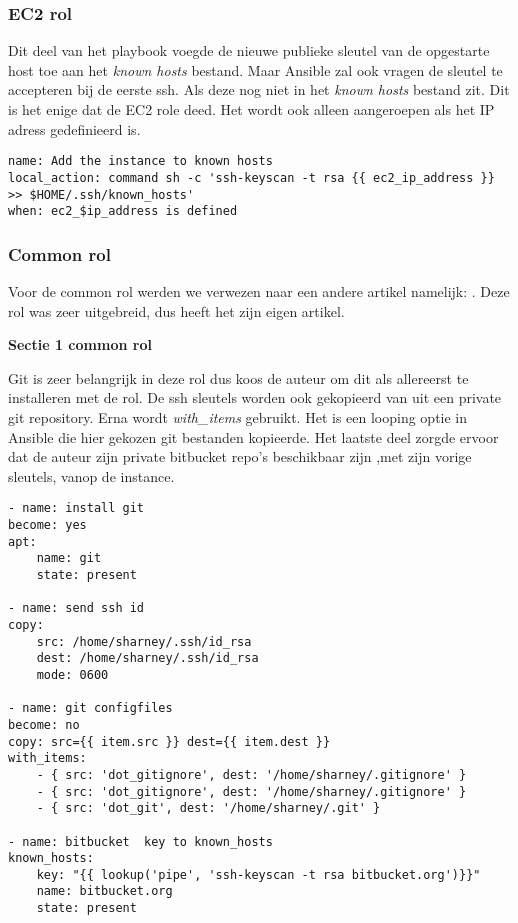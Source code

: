 \subsubsection{EC2 rol}
Dit deel van het playbook voegde de nieuwe publieke sleutel van de opgestarte host toe aan het \textit{known hosts} bestand. Maar Ansible zal ook vragen de sleutel te accepteren bij de eerste ssh. Als deze nog niet in het \textit{known hosts} bestand zit. Dit is het enige dat de EC2 role deed. Het wordt ook alleen aangeroepen als het IP adress gedefinieerd is.

\begin{lstlisting}
name: Add the instance to known hosts
local_action: command sh -c 'ssh-keyscan -t rsa {{ ec2_ip_address }} >> $HOME/.ssh/known_hosts'
when: ec2_$ip_address is defined
\end{lstlisting}

\subsubsection{Common rol}
Voor de common rol werden we verwezen naar een andere artikel namelijk: \autocite{commonscottharney}. Deze rol was zeer uitgebreid, dus heeft het zijn eigen artikel.

\textbf{Sectie 1 common rol}

Git is zeer belangrijk in deze rol dus koos de auteur om dit als allereerst te installeren met de rol. De ssh sleutels worden ook gekopieerd van uit een private git repository. Erna wordt \textit{with\_items} gebruikt. Het is een looping optie in Ansible die hier gekozen git bestanden kopieerde. Het laatste deel zorgde ervoor dat de auteur zijn private bitbucket repo's beschikbaar zijn ,met zijn vorige sleutels, vanop de instance.
\begin{lstlisting}
- name: install git
become: yes
apt:
    name: git
    state: present

- name: send ssh id
copy:
    src: /home/sharney/.ssh/id_rsa
    dest: /home/sharney/.ssh/id_rsa
    mode: 0600

- name: git configfiles
become: no
copy: src={{ item.src }} dest={{ item.dest }}
with_items:
    - { src: 'dot_gitignore', dest: '/home/sharney/.gitignore' }
    - { src: 'dot_gitignore', dest: '/home/sharney/.gitignore' }
    - { src: 'dot_git', dest: '/home/sharney/.git' }

- name: bitbucket  key to known_hosts
known_hosts:
    key: "{{ lookup('pipe', 'ssh-keyscan -t rsa bitbucket.org')}}"
    name: bitbucket.org
    state: present
\end{lstlisting}

